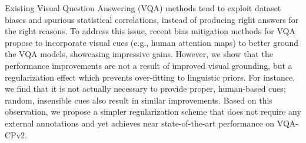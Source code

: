 Existing Visual Question Answering (VQA) methods tend to exploit dataset biases and spurious statistical correlations, instead of producing right answers for the right reasons. To address this issue, recent bias mitigation methods for VQA propose to incorporate visual cues (e.g., human attention maps) to better ground the VQA models, showcasing impressive gains. However, we show that the performance improvements are not a result of improved visual grounding, but a regularization effect which prevents over-fitting to linguistic priors. For instance, we find that it is not actually necessary to provide proper, human-based cues; random, insensible cues also result in similar improvements. Based on this observation, we propose a simpler regularization scheme that does not require any external annotations and yet achieves near state-of-the-art performance on VQA-CPv2.
